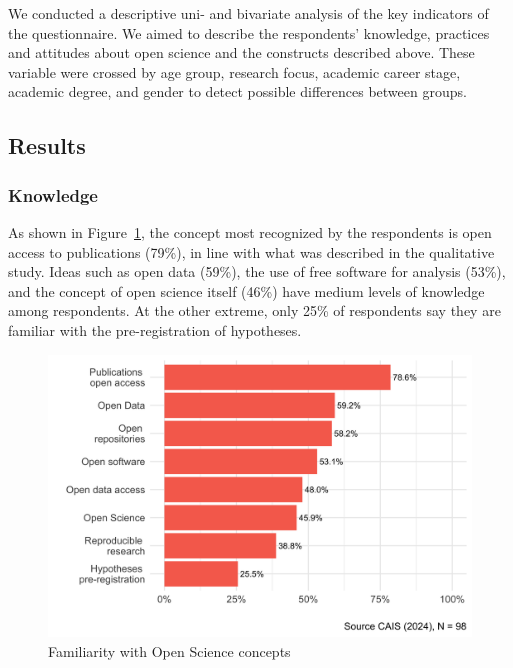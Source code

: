 \documentclass[
  letterpaper,
  DIV=11,
  numbers=noendperiod]{scrartcl}
\begin{document}
We conducted a descriptive uni- and bivariate analysis of the key
indicators of the questionnaire. We aimed to describe the respondents'
knowledge, practices and attitudes about open science and the constructs
described above. These variable were crossed by age group, research
focus, academic career stage, academic degree, and gender to detect
possible differences between groups.

\hypertarget{results-1}{%
\subsection{Results}\label{results-1}}

\hypertarget{knowledge}{%
\subsubsection{\texorpdfstring{\textbf{Knowledge}}{Knowledge}}\label{knowledge}}

As shown in Figure~\ref{fig-cca}, the concept most recognized by the
respondents is open access to publications (79\%), in line with what was
described in the qualitative study. Ideas such as open data (59\%), the
use of free software for analysis (53\%), and the concept of open
science itself (46\%) have medium levels of knowledge among respondents.
At the other extreme, only 25\% of respondents say they are familiar
with the pre-registration of hypotheses.

\begin{figure}[H]

{\centering \includegraphics{paper_files/figure-pdf/fig-cca-1.png}

}

\caption{\label{fig-cca}Familiarity with Open Science concepts}

\end{figure}
\end{document}
